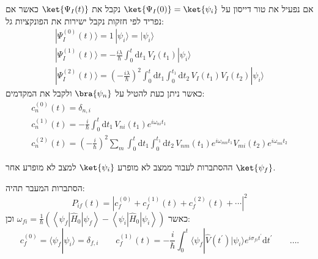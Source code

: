 \documentclass{tstextbook}
\begin{document}
\begin{proposition}
אם נפעיל את טור דייסון על \(\ket{\Psi_{I}(0)}=\ket{\psi_{i}}\) נקבל את \(\ket{\Psi_{I}(t)}\) כאשר אם נפריד לפי חזקות נקבל ישירות את הפונקציות גל:
$$\begin{gather}|\Psi_{I}^{(0)}(t)\rangle=1\,|\psi_{i}\rangle=|\psi_{i}\rangle\\ |\Psi_{I}^{(1)}(t)\rangle=-\frac{i\lambda}{\hbar}\int_{0}^{t}\mathrm{d} t_{1}\,V_{I}(t_{1})|\psi_{i}\rangle\\|\Psi_{I}^{(2)}(t)\rangle=\left(-\frac{i\lambda}{\hbar}\right)^{2}\int_{0}^{t}\mathrm{d} t_{1}\int_{0}^{t_{1}}\mathrm{d} t_{2}\,V_{I}(t_{1})V_{I}(t_{2})|\psi_{i}\rangle 
\end{gather}$$
כאשר ניתן כעת להטיל על \(\bra{\psi_{n}}\) ולקבל את המקדמים:
$$\begin{gather}c_{n}^{(0)}(t)=\delta_{n,i}\\ c_{n}^{(1)}(t)=-\frac{i}{\hbar}\int_{0}^{t}\mathrm{d} t_{1}\,V_{n i}(t_{1})e^{i\omega_{n i}t_{1}}\\c_{n}^{(2)}(t)=\left(-\frac{i}{\hbar}\right)^{2}\sum_{m}\int_{0}^{t}\mathrm{d} t_{1}\int_{0}^{t_{1}}\mathrm{d} t_{2}\,V_{n m}(t_{1})e^{i\omega_{m n}t_{1}}V_{m i}(t_{2})e^{i\omega_{m i}t_{2}} 
\end{gather}$$

\end{proposition}
\begin{definition}
ההסתברות לעבור ממצב לא מופרע \(\ket{\psi_{i}}\) למצב לא מופרע אחר \(\ket{\psi_{f}}\).

\end{definition}
\begin{proposition}
הסתברות המעבר תהיה:
$$P_{i f}(t)=\left|c_{f}^{(0)}+c_{f}^{(1)}(t)+c_{f}^{(2)}(t)+\cdots\right|^{2}$$
כאשר \(\omega_{fi}=\frac{1}{\hbar}\left(\left\langle \psi_{f}|\hat{H}_{0}|\psi_{f} \right\rangle-\left\langle \psi_{i}|\hat{H}_{0}|\psi_{i} \right\rangle\right)\) וכן:
$$c_{f}^{(0)}=\langle\psi_{f}|\psi_{i}\rangle=\delta_{f,i}\qquad c_{f}^{(1)}(t)=-\frac{i}{\hbar}\int_{0}^{t}\langle\psi_{f}|\hat{V}(t^{\prime})|\psi_{i}\rangle e^{i\sigma_{f i}t^{\prime}}\mathrm{d}t^{\prime}\qquad  \ldots.$$

\end{proposition}
\end{document}
